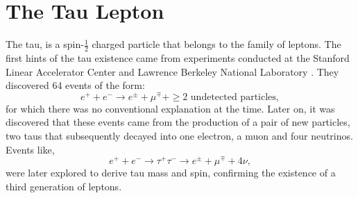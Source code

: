 \section{The Tau Lepton}\label{chap2sec1}
The tau, is a spin-$\frac{1}{2}$ charged particle that belongs to the family of leptons. The first hints of the tau existence came from experiments conducted at the Stanford Linear Accelerator Center and Lawrence Berkeley National Laboratory \cite{PhysRevLett.35.1489}. They discovered 64 events of the form:
\begin{equation}
	e^+ + e^- \to e^\pm + \mu^\mp + \geq \text{2 undetected particles},
\end{equation}
for which there was no conventional explanation at the time. Later on, it was discovered that these events came from the production of a pair of new particles, two taus that subsequently decayed into one electron, a muon and four neutrinos. Events like,
\begin{equation}
e^+ + e^- \to \tau^+ \tau^- \to e^\pm + \mu^\mp + 4\nu,
\end{equation}	
were later explored to derive tau mass and spin, confirming the existence of a third generation of leptons. 

